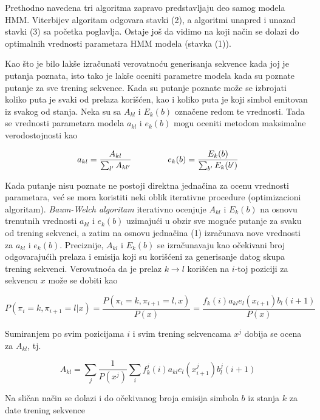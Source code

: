 \documentclass[a4paper, 12pt]{article}
\begin{document}
Prethodno navedena tri algoritma zapravo predstavljaju deo samog modela HMM. Viterbijev algoritam odgovara stavki (2), a algoritmi unapred i unazad stavki (3) sa početka poglavlja. Ostaje još da vidimo na koji način se dolazi do optimalnih vrednosti parametara HMM modela (stavka (1)).

Kao što je bilo lakše izračunati verovatnoću generisanja sekvence kada joj je putanja poznata, isto tako je lakše oceniti parametre modela kada su poznate putanje za sve trening sekvence. Kada su putanje poznate može se izbrojati koliko puta je svaki od prelaza korišćen, kao i koliko puta je koji simbol emitovan iz svakog od stanja. Neka su sa $A_{kl}$ i $E_k(b)$ označene redom te vrednosti. Tada se vrednosti parametara modela $a_{kl}$ i $e_k(b)$ mogu oceniti metodom maksimalne verodostojnosti kao

\begin{equation}\label{eq:pythagoras}
a_{kl} = \frac{A_{kl}}{\sum_{l'}A_{kl'}}  \hspace{1.5cm}  e_k(b) = \frac{E_k(b)}{\sum_{b'}{E_k(b')}}
\end{equation}

Kada putanje nisu poznate ne postoji direktna jednačina za ocenu vrednosti parametara, već se mora koristiti neki oblik iterativne procedure (optimizacioni algoritam). \textit{Baum-Welch algoritam} iterativno ocenjuje $A_{kl}$ i $E_k(b)$ na osnovu trenutnih vrednosti $a_{kl}$ i $e_k(b)$ uzimajući u obzir sve moguće putanje za svaku od trening sekvenci, a zatim na osnovu jednačina (1) izračunava nove vrednosti za $a_{kl}$ i $e_k(b)$. Preciznije, $A_{kl}$ i $E_k(b)$ se izračunavaju kao očekivani broj odgovarajućih prelaza i emisija koji su korišćeni za generisanje datog skupa trening sekvenci. Verovatnoća da je prelaz $k \rightarrow l$ korišćen na $i$-toj poziciji za sekvencu $x$ može se dobiti kao

$$P(\pi_i = k, \pi_{i+1} = l | x) = \frac{P(\pi_i = k, \pi_{i+1} = l, x)}{P(x)} = \frac{f_k(i)a_{kl}e_l(x_{i+1})b_l(i+1)}{P(x)}$$

\noindent Sumiranjem po svim pozicijama $i$ i svim trening sekvencama $x^j$ dobija se ocena za $A_{kl}$, tj.

\begin{equation}\label{eq:pythagoras}
A_{kl} = \sum_{j}\frac{1}{P(x^j)}\sum_{i}f_k^j(i)a_{kl}e_l(x_{i+1}^j)b_l^j(i+1)
\end{equation}

\noindent Na sličan način se dolazi i do očekivanog broja emisija simbola $b$ iz stanja $k$ za date trening sekvence
\end{document}
